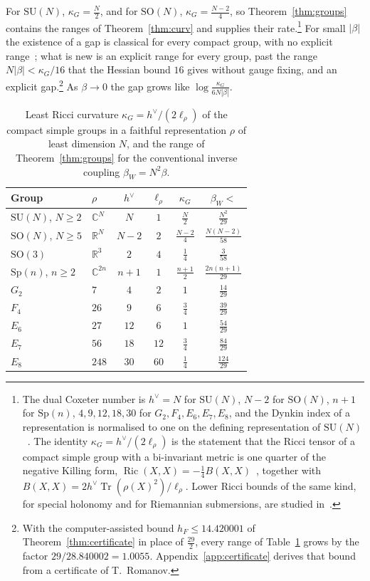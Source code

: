 \documentclass[11pt]{amsart}
\theoremstyle{definition}
\theoremstyle{remark}
\numberwithin{equation}{section}
\newcommand{\R}{\mathbb{R}}
\newcommand{\C}{\mathbb{C}}
\newcommand{\SU}{\mathrm{SU}}
\newcommand{\SO}{\mathrm{SO}}
\newcommand{\Tr}{\operatorname{Tr}}
\newcommand{\Ric}{\operatorname{Ric}}
\begin{document}
For $\SU(N)$, $\kappa_G=\frac N2$, and for $\SO(N)$, $\kappa_G=\frac{N-2}4$, so
Theorem~\ref{thm:groups} contains the ranges of Theorem~\ref{thm:curv} and
supplies their rate.\footnote{The dual Coxeter number is $h^\vee=N$ for $\SU(N)$, $N-2$ for
$\SO(N)$, $n+1$ for $\mathrm{Sp}(n)$, $4,9,12,18,30$ for $G_2,F_4,E_6,E_7,E_8$, and
the Dynkin index of a representation is normalised to one on the defining
representation of $\SU(N)$~\cite[Ch.~6]{Kac90}. The identity
$\kappa_G=h^\vee/(2\ell_\rho)$ is the statement that the Ricci tensor of a
compact simple group with a bi-invariant metric is one quarter of the
negative Killing form, $\Ric(X,X)=-\frac14B(X,X)$~\cite{Mil76}, together with
$B(X,X)=2h^\vee\Tr(\rho(X)^2)/\ell_\rho$. Lower Ricci bounds of the same
kind, for special holonomy and for Riemannian submersions, are studied
in~\cite{BTBS26,GBN26}.} For small $|\beta|$ the existence of a gap is classical
for every compact group, with no explicit range~\cite[Thm.~3.6]{OSei78}; what is new is an explicit range for
every group, past the range $N|\beta|<\kappa_G/16$ that the Hessian bound $16$
gives without gauge fixing, and an explicit gap.\footnote{With the computer-assisted bound $h_F\le14.420001$ of
Theorem~\ref{thm:certificate} in place of $\frac{29}2$, every range of
Table~\ref{tab:groups} grows by the factor $29/28.840002=1.0055$.
Appendix~\ref{app:certificate} derives that bound from a certificate of
T.~Romanov.} As $\beta\to0$ the gap grows like $\log\frac{\kappa_G}{6N|\beta|}$.

\begin{table}[tb]
\caption{Least Ricci curvature $\kappa_G=h^\vee/(2\ell_\rho)$ of the compact
simple groups in a faithful representation $\rho$ of least dimension $N$, and
the range of Theorem~\ref{thm:groups} for the conventional inverse coupling
$\beta_W=N^2\beta$.}
\label{tab:groups}
\begin{tabular}{llcccc}
\toprule
Group&$\rho$&$h^\vee$&$\ell_\rho$&$\kappa_G$&$\beta_W<$\\
\midrule
$\SU(N)$, $N\ge2$&$\C^N$&$N$&$1$&$\frac N2$&$\frac{N^2}{29}$\\
$\SO(N)$, $N\ge5$&$\R^N$&$N-2$&$2$&$\frac{N-2}4$&$\frac{N(N-2)}{58}$\\
$\SO(3)$&$\R^3$&$2$&$4$&$\frac14$&$\frac3{58}$\\
$\mathrm{Sp}(n)$, $n\ge2$&$\C^{2n}$&$n+1$&$1$&$\frac{n+1}2$&$\frac{2n(n+1)}{29}$\\
$G_2$&$7$&$4$&$2$&$1$&$\frac{14}{29}$\\
$F_4$&$26$&$9$&$6$&$\frac34$&$\frac{39}{29}$\\
$E_6$&$27$&$12$&$6$&$1$&$\frac{54}{29}$\\
$E_7$&$56$&$18$&$12$&$\frac34$&$\frac{84}{29}$\\
$E_8$&$248$&$30$&$60$&$\frac14$&$\frac{124}{29}$\\
\bottomrule
\end{tabular}
\end{table}
\end{document}
